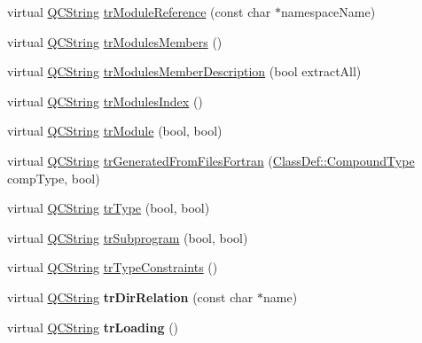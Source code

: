 \begin{DoxyCompactItemize}
virtual \mbox{\hyperlink{class_q_c_string}{Q\+C\+String}} \mbox{\hyperlink{class_translator_chinese_a9dad8400318638a97741ea6548d63ab6}{tr\+Module\+Reference}} (const char $\ast$namespace\+Name)
\item 
virtual \mbox{\hyperlink{class_q_c_string}{Q\+C\+String}} \mbox{\hyperlink{class_translator_chinese_acef3e40d4f7cdc93177e46a5051e4dac}{tr\+Modules\+Members}} ()
\item 
virtual \mbox{\hyperlink{class_q_c_string}{Q\+C\+String}} \mbox{\hyperlink{class_translator_chinese_aa11d57b205557658c5ab3851b28590d8}{tr\+Modules\+Member\+Description}} (bool extract\+All)
\item 
virtual \mbox{\hyperlink{class_q_c_string}{Q\+C\+String}} \mbox{\hyperlink{class_translator_chinese_a87ceeb90f60f6a22b0f75310036c49bc}{tr\+Modules\+Index}} ()
\item 
virtual \mbox{\hyperlink{class_q_c_string}{Q\+C\+String}} \mbox{\hyperlink{class_translator_chinese_a07ee2974f4e86f9aab164b798e21d153}{tr\+Module}} (bool, bool)
\item 
virtual \mbox{\hyperlink{class_q_c_string}{Q\+C\+String}} \mbox{\hyperlink{class_translator_chinese_a876cf8b6a040eaeb0bb4be19151087c5}{tr\+Generated\+From\+Files\+Fortran}} (\mbox{\hyperlink{class_class_def_ae70cf86d35fe954a94c566fbcfc87939}{Class\+Def\+::\+Compound\+Type}} comp\+Type, bool)
\item 
virtual \mbox{\hyperlink{class_q_c_string}{Q\+C\+String}} \mbox{\hyperlink{class_translator_chinese_ab9ac4259fdcf8844575dbd2b14d3dfd7}{tr\+Type}} (bool, bool)
\item 
virtual \mbox{\hyperlink{class_q_c_string}{Q\+C\+String}} \mbox{\hyperlink{class_translator_chinese_a0ad7d991fbd21f55b25b4d9d57896da0}{tr\+Subprogram}} (bool, bool)
\item 
virtual \mbox{\hyperlink{class_q_c_string}{Q\+C\+String}} \mbox{\hyperlink{class_translator_chinese_a3fae3e9b8d961fff3b85130f84ef4445}{tr\+Type\+Constraints}} ()
\item 
\mbox{\label{class_translator_chinese_a2a08afc3831eec855fd270c0612654d5}} 
virtual \mbox{\hyperlink{class_q_c_string}{Q\+C\+String}} {\bfseries tr\+Dir\+Relation} (const char $\ast$name)
\item 
\mbox{\label{class_translator_chinese_a3cce85a8c735d1c66b14b1999d196117}} 
virtual \mbox{\hyperlink{class_q_c_string}{Q\+C\+String}} {\bfseries tr\+Loading} ()

\end{DoxyCompactItemize}
